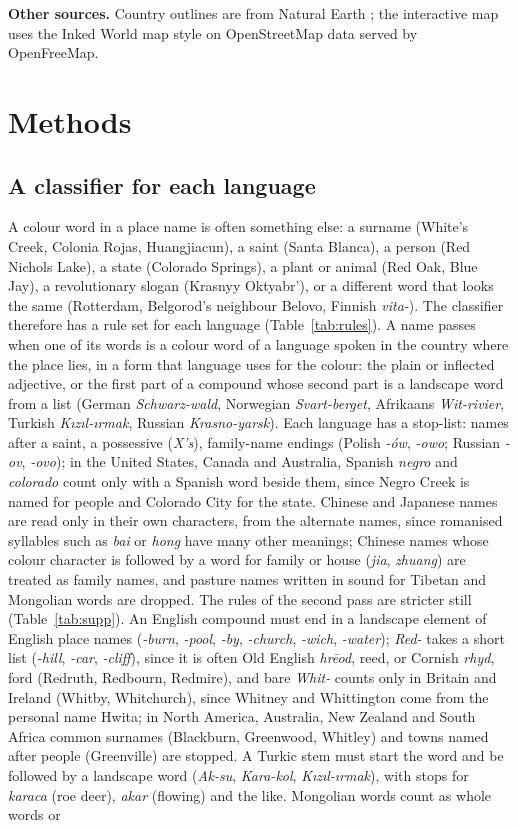 \documentclass[11pt,a4paper]{article}
\begin{document}
\textbf{Other sources.} Country outlines are from Natural Earth \citep{naturalearth}; the interactive map uses the Inked World map style \citep{inkmap} on OpenStreetMap data served by OpenFreeMap.

\section{Methods}
\subsection{A classifier for each language}
A colour word in a place name is often something else: a surname (White's Creek, Colonia Rojas, Huangjiacun), a saint (Santa Blanca), a person (Red Nichols Lake), a state (Colorado Springs), a plant or animal (Red Oak, Blue Jay), a revolutionary slogan (Krasnyy Oktyabr'), or a different word that looks the same (Rotterdam, Belgorod's neighbour Belovo, Finnish \textit{vita-}). The classifier therefore has a rule set for each language (Table~\ref{tab:rules}). A name passes when one of its words is a colour word of a language spoken in the country where the place lies, in a form that language uses for the colour: the plain or inflected adjective, or the first part of a compound whose second part is a landscape word from a list (German \textit{Schwarz-wald}, Norwegian \textit{Svart-berget}, Afrikaans \textit{Wit-rivier}, Turkish \textit{Kızıl-ırmak}, Russian \textit{Krasno-yarsk}). Each language has a stop-list: names after a saint, a possessive (\textit{X's}), family-name endings (Polish \textit{-ów}, \textit{-owo}; Russian \textit{-ov}, \textit{-ovo}); in the United States, Canada and Australia, Spanish \textit{negro} and \textit{colorado} count only with a Spanish word beside them, since Negro Creek is named for people and Colorado City for the state. Chinese and Japanese names are read only in their own characters, from the alternate names, since romanised syllables such as \textit{bai} or \textit{hong} have many other meanings; Chinese names whose colour character is followed by a word for family or house (\textit{jia}, \textit{zhuang}) are treated as family names, and pasture names written in sound for Tibetan and Mongolian words are dropped. The rules of the second pass are stricter still (Table~\ref{tab:supp}). An English compound must end in a landscape element of English place names (\textit{-burn}, \textit{-pool}, \textit{-by}, \textit{-church}, \textit{-wich}, \textit{-water}); \textit{Red-} takes a short list (\textit{-hill}, \textit{-car}, \textit{-cliff}), since it is often Old English \textit{hr\=eod}, reed, or Cornish \textit{rhyd}, ford (Redruth, Redbourn, Redmire), and bare \textit{Whit-} counts only in Britain and Ireland (Whitby, Whitchurch), since Whitney and Whittington come from the personal name Hwita; in North America, Australia, New Zealand and South Africa common surnames (Blackburn, Greenwood, Whitley) and towns named after people (Greenville) are stopped. A Turkic stem must start the word and be followed by a landscape word (\textit{Ak-su}, \textit{Kara-kol}, \textit{Kızıl-ırmak}), with stops for \textit{karaca} (roe deer), \textit{akar} (flowing) and the like. Mongolian words count as whole words or 
\end{document}
